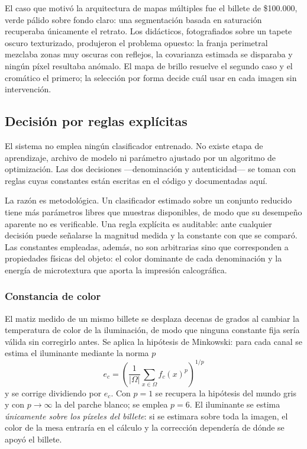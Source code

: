 \documentclass[conference]{IEEEtran}
\begin{document}
El caso que motivó la arquitectura de mapas múltiples fue el billete de
\$100.000, verde pálido sobre fondo claro: una segmentación basada en
saturación recuperaba únicamente el retrato. Los didácticos, fotografiados
sobre un tapete oscuro texturizado, produjeron el problema opuesto: la
franja perimetral mezclaba zonas muy oscuras con reflejos, la covarianza
estimada se disparaba y ningún píxel resultaba anómalo. El mapa de brillo
resuelve el segundo caso y el cromático el primero; la selección por forma
decide cuál usar en cada imagen sin intervención.

\subsection{Decisión por reglas explícitas}

El sistema no emplea ningún clasificador entrenado. No existe etapa de
aprendizaje, archivo de modelo ni parámetro ajustado por un algoritmo
de optimización. Las dos decisiones ---denominación y autenticidad---
se toman con reglas cuyas constantes están escritas en el código y
documentadas aquí.

La razón es metodológica. Un clasificador estimado sobre un conjunto
reducido tiene más parámetros libres que muestras disponibles, de modo
que su desempeño aparente no es verificable. Una regla explícita es
auditable: ante cualquier decisión puede señalarse la magnitud medida y
la constante con que se comparó. Las constantes empleadas, además, no
son arbitrarias sino que corresponden a propiedades físicas del objeto:
el color dominante de cada denominación y la energía de microtextura
que aporta la impresión calcográfica.

\subsubsection{Constancia de color}
El matiz medido de un mismo billete se desplaza decenas de grados al
cambiar la temperatura de color de la iluminación, de modo que ninguna
constante fija sería válida sin corregirlo antes. Se aplica la
hipótesis de Minkowski: para cada canal se estima el iluminante
mediante la norma $p$
\begin{equation}
e_c = \left(\frac{1}{|\Omega|}\sum_{x\in\Omega} f_c(x)^p\right)^{1/p}
\end{equation}
y se corrige dividiendo por $e_c$. Con $p=1$ se recupera la hipótesis
del mundo gris y con $p\to\infty$ la del parche blanco; se emplea
$p=6$. El iluminante se estima \emph{únicamente sobre los píxeles del
billete}: si se estimara sobre toda la imagen, el color de la mesa
entraría en el cálculo y la corrección dependería de dónde se apoyó el
billete.
\end{document}
